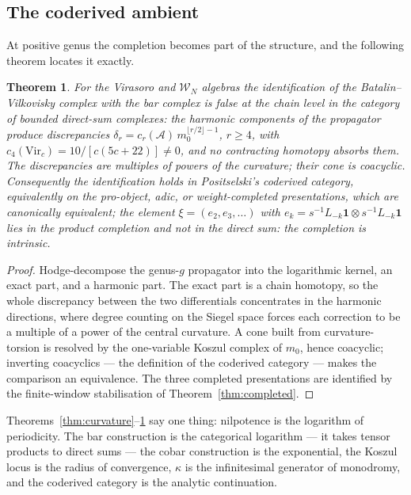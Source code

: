 \documentclass[11pt]{amsart}
\numberwithin{equation}{section}
\theoremstyle{plain}
\newtheorem{theorem}{Theorem}[section]
\theoremstyle{definition}
\theoremstyle{remark}
\newcommand{\cA}{\mathcal{A}}
\newcommand{\cW}{\mathcal{W}}
\newcommand{\Vir}{\mathrm{Vir}}
\begin{document}
\subsection{The coderived ambient}

At positive genus the completion becomes part of the structure, and
the following theorem locates it exactly.

\begin{theorem}\label{thm:coderived}
For the Virasoro and $\cW_N$ algebras the identification of the
Batalin--Vilkovisky complex with the bar complex is false at the chain
level in the category of bounded direct-sum complexes: the harmonic
components of the propagator produce discrepancies
$\delta_r=c_r(\cA)\,m_0^{\lfloor r/2\rfloor-1}$, $r\geq4$, with
$c_4(\Vir_c)=10/[c(5c+22)]\neq0$, and no contracting homotopy absorbs
them. The discrepancies are multiples of powers of the curvature; their
cone is coacyclic. Consequently the identification holds in
Positselski's coderived category, equivalently on the pro-object,
adic, or weight-completed presentations, which are canonically
equivalent; the element
$\xi=(e_2,e_3,\dots)$ with $e_k=s^{-1}L_{-k}\mathbf{1}\otimes
s^{-1}L_{-k}\mathbf{1}$ lies in the product completion and not in the
direct sum: the completion is intrinsic.
\end{theorem}

\begin{proof}
Hodge-decompose the genus-$g$ propagator into the logarithmic kernel,
an exact part, and a harmonic part. The exact part is a chain
homotopy, so the whole discrepancy between the two differentials
concentrates in the harmonic directions, where degree counting on
the Siegel space forces each correction to be a multiple of a power
of the central curvature. A cone built from curvature-torsion is
resolved by the one-variable Koszul complex of $m_0$, hence
coacyclic; inverting coacyclics --- the definition of the coderived
category --- makes the comparison an equivalence. The three completed
presentations are identified by the finite-window stabilisation of
Theorem~\ref{thm:completed}.
\end{proof}

Theorems~\ref{thm:curvature}--\ref{thm:coderived} say one thing:
nilpotence is the logarithm of periodicity. The bar construction is the
categorical logarithm --- it takes tensor products to direct sums --- the
cobar construction is the exponential, the Koszul locus is the radius of
convergence, $\kappa$ is the infinitesimal generator of monodromy, and
the coderived category is the analytic continuation.
\end{document}
